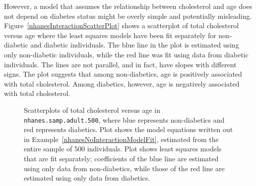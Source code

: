 However, a model that assumes the relationship between cholesterol and age does not depend on diabetes status might be overly simple and potentially misleading. Figure~\ref{nhanesInteractionScatterPlot} shows a scatterplot of total cholesterol versus age where the least squares models have been fit separately for non-diabetic and diabetic individuals. The blue line in the plot is estimated using only non-diabetic individuals, while the red line was fit using data from diabetic individuals. The lines are not parallel, and in fact, have slopes with different signs. The plot suggests that among non-diabetics, age is positively associated with total cholesterol. Among diabetics, however, age is negatively associated with total cholesterol.

\begin{figure}[h!]
	\centering
{}
	\caption{Scatterplots of total cholesterol versus age in \texttt{nhanes.samp.adult.500}, where blue represents non-diabetics and red represents diabetics. Plot  shows the model equations written out in Example~\ref{nhanesNoInteractionModelFit}, estimated from the entire sample of 500 individuals. Plot  shows least squares models that are fit separately; coefficients of the blue line are estimated using only data from non-diabetics, while those of the red line are estimated using only data from diabetics. }
	\label{nhanesInteractionScatterPlotComparison}
\end{figure}

